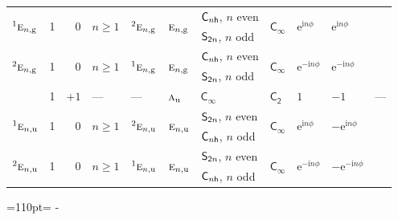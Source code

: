 \documentclass[10pt,a4paper]{article}
\newcommand{\needspace}[1]{\par\penalty-100\begingroup\dimen0=#1\relax\dimen2=\pagegoal
  \advance\dimen2-\pagetotal\ifdim\dimen0>\dimen2\relax\ifdim\dimen2>0pt\vfil\break\fi\fi
  \endgroup}
\numberwithin{equation}{section}
\newcommand{\grp}[1]{\mathsf{#1}}
\newcommand{\irr}[1]{\text{\normalfont\scshape #1}}
\newcommand{\conjpair}[1]{{}^{#1}}
\newcommand{\detbox}[1]{{\setlength{\fboxsep}{1pt}\fbox{#1}}}
\newcommand{\ptag}[1]{\mathrm{#1}}
\newcommand{\iunit}{\mathrm{i}}
\newcommand{\expe}{\mathrm{e}}
\newlength{\fillwidth}\newlength{\cellwidth}\newlength{\colwidth}
\begin{document}
{\begin{longtable}{@{}lrrlllllll>{\RaggedRight\arraybackslash}p{\fillwidth}@{}}
\multirow{2}{*}{$\conjpair{1}\irr{e}_{n,\ptag{g}}$} & \multirow{2}{*}{1} & \multirow{2}{*}{$0$} & \multirow{2}{*}{$n \ge 1$} & \multirow{2}{*}{$\conjpair{2}\irr{e}_{n,\ptag{g}}$} & \multirow{2}{*}{$\irr{e}_{n,\ptag{g}}$} & $\grp{C_{\mathnormal{n}h}}$, $n$ even & \multirow{2}{*}{\href{Cinf.pdf}{$\grp{C_{\infty}}$}} & \multirow{2}{*}{$\expe^{\iunit n\phi}$} & \multirow{2}{*}{$\expe^{\iunit n\phi}$} & \multirow{2}{=}{\RaggedRight ---}\\*
 &  &  &  &  &  & $\grp{S_{2\mathnormal{n}}}$, $n$ odd &  &  &  & \\
\multirow{2}{*}{$\conjpair{2}\irr{e}_{n,\ptag{g}}$} & \multirow{2}{*}{1} & \multirow{2}{*}{$0$} & \multirow{2}{*}{$n \ge 1$} & \multirow{2}{*}{$\conjpair{1}\irr{e}_{n,\ptag{g}}$} & \multirow{2}{*}{$\irr{e}_{n,\ptag{g}}$} & $\grp{C_{\mathnormal{n}h}}$, $n$ even & \multirow{2}{*}{\href{Cinf.pdf}{$\grp{C_{\infty}}$}} & \multirow{2}{*}{$\expe^{-\iunit n\phi}$} & \multirow{2}{*}{$\expe^{-\iunit n\phi}$} & \multirow{2}{=}{\RaggedRight ---}\\*
 &  &  &  &  &  & $\grp{S_{2\mathnormal{n}}}$, $n$ odd &  &  &  & \\
\detbox{$\irr{a}_{\ptag{u}}$} & 1 & $+1$ & --- & --- & $\irr{a}_{\ptag{u}}$ & \href{Cinf.pdf}{$\grp{C_{\infty}}$} & \href{C2.pdf}{$\grp{C_{2}}$} & $1$ & $-1$ & ---\\
\multirow{2}{*}{$\conjpair{1}\irr{e}_{n,\ptag{u}}$} & \multirow{2}{*}{1} & \multirow{2}{*}{$0$} & \multirow{2}{*}{$n \ge 1$} & \multirow{2}{*}{$\conjpair{2}\irr{e}_{n,\ptag{u}}$} & \multirow{2}{*}{$\irr{e}_{n,\ptag{u}}$} & $\grp{S_{2\mathnormal{n}}}$, $n$ even & \multirow{2}{*}{\href{Cinf.pdf}{$\grp{C_{\infty}}$}} & \multirow{2}{*}{$\expe^{\iunit n\phi}$} & \multirow{2}{*}{$-\expe^{\iunit n\phi}$} & \multirow{2}{=}{\RaggedRight ---}\\*
 &  &  &  &  &  & $\grp{C_{\mathnormal{n}h}}$, $n$ odd &  &  &  & \\
\multirow{2}{*}{$\conjpair{2}\irr{e}_{n,\ptag{u}}$} & \multirow{2}{*}{1} & \multirow{2}{*}{$0$} & \multirow{2}{*}{$n \ge 1$} & \multirow{2}{*}{$\conjpair{1}\irr{e}_{n,\ptag{u}}$} & \multirow{2}{*}{$\irr{e}_{n,\ptag{u}}$} & $\grp{S_{2\mathnormal{n}}}$, $n$ even & \multirow{2}{*}{\href{Cinf.pdf}{$\grp{C_{\infty}}$}} & \multirow{2}{*}{$\expe^{-\iunit n\phi}$} & \multirow{2}{*}{$-\expe^{-\iunit n\phi}$} & \multirow{2}{=}{\RaggedRight ---}\\*
 &  &  &  &  &  & $\grp{C_{\mathnormal{n}h}}$, $n$ odd &  &  &  & \\
\bottomrule\end{longtable}}
\needspace{110pt}
\end{document}
